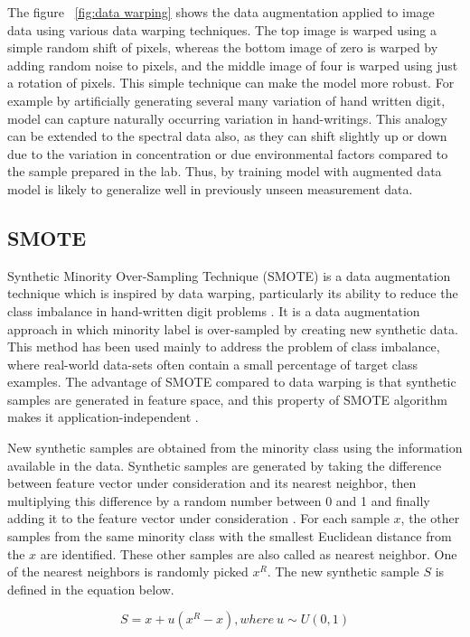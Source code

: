 The figure ~\ref{fig:data warping} shows the data augmentation applied to image data using various data warping techniques. The top image is warped using a simple random shift of pixels, whereas the bottom image of zero is warped by adding random noise to pixels, and the middle image of four is warped using just a rotation of pixels. This simple technique can make the model more robust. For example by artificially generating several many variation of hand written digit, model can capture naturally occurring variation in hand-writings. This analogy can be extended to the spectral data also, as they can shift slightly up or down due to the variation in concentration or due environmental factors compared to the sample prepared in the lab. Thus, by training model with augmented data model is likely to generalize well in previously unseen measurement data. 

\subsection{SMOTE}
Synthetic Minority Over-Sampling Technique (SMOTE) is a data augmentation technique which is inspired by data warping, particularly its ability to reduce the class imbalance in hand-written digit problems \citep{chawla2002smote}. It is a data augmentation approach in which minority label is over-sampled by creating new synthetic data. This method has been used mainly to address the problem of class imbalance, where real-world data-sets often contain a small percentage of target class examples. The advantage of SMOTE compared to data warping is that synthetic samples are generated in feature space, and this property of SMOTE algorithm makes it application-independent \citep{chawla2002smote}. 

New synthetic samples are obtained from the minority class using the information available in the data. Synthetic samples are generated by taking the difference between feature vector under consideration and its nearest neighbor, then multiplying this difference by a random number between 0 and 1 and finally adding it to the feature vector under consideration \citep{chawla2002smote}. For each sample $x$, the other samples from the same minority class with the smallest Euclidean distance from the $x$ are identified. These other samples are also called as nearest neighbor. One of the nearest neighbors is randomly picked $x^{R}$. The new synthetic sample $S$ is defined in the equation below.

\begin{equation}
S= x + u(x^R -x), where\ u \sim U(0,1) 
\end{equation} \citep{chawla2002smote} 

